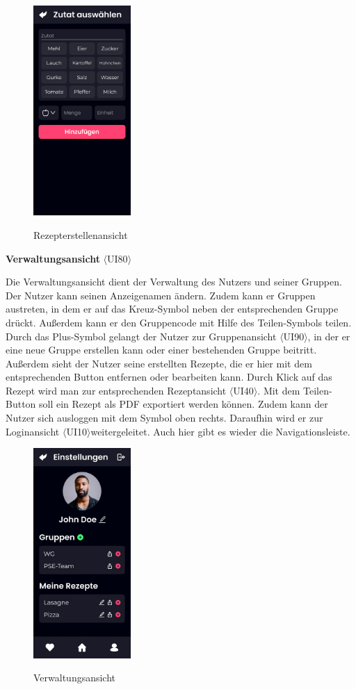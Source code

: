 \documentclass[parskip=full]{scrartcl}
\begin{document}
\begin{figure}[!htp]
    \centering
    \includegraphics[height=80mm]{images/section7/IngredientPickerView.jpg}
    \label{fig:A78}
    \caption{Rezepterstellenansicht}
\end{figure}

\textbf{Verwaltungsansicht} $\langle$UI80$\rangle$

Die Verwaltungsansicht dient der Verwaltung des Nutzers und seiner Gruppen. Der Nutzer kann seinen Anzeigenamen ändern. Zudem kann er Gruppen austreten, in dem er auf das Kreuz-Symbol neben der entsprechenden Gruppe drückt. Außerdem kann er den Gruppencode mit Hilfe des Teilen-Symbols teilen. Durch das Plus-Symbol gelangt der Nutzer zur Gruppenansicht $\langle$UI90$\rangle$, in der er eine neue Gruppe erstellen kann oder einer bestehenden Gruppe beitritt. Außerdem sieht der Nutzer seine erstellten Rezepte, die er hier mit dem entsprechenden Button entfernen oder bearbeiten kann. Durch Klick auf das Rezept wird man zur entsprechenden Rezeptansicht $\langle$UI40$\rangle$. Mit dem Teilen-Button soll ein Rezept als PDF exportiert werden können.
Zudem kann der Nutzer sich ausloggen mit dem Symbol oben rechts. Daraufhin wird er zur Loginansicht $\langle$UI10$\rangle$weitergeleitet. Auch hier gibt es wieder die Navigationsleiste.

\begin{figure}[!htp]
    \centering
    \includegraphics[height=80mm]{images/section7/SettingsView.jpg}
    \label{fig:A79}
    \caption{Verwaltungsansicht}
\end{figure}
\newpage
\end{document}
